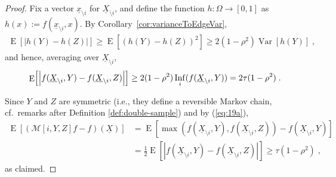 \documentclass{daj}
\newcommand{\1}{\mathbbm{1}}
\theoremstyle{plain}
\theoremstyle{definition}
\DeclareMathOperator*{\EE}{E}
\DeclareMathOperator*{\Var}{Var}
\DeclareMathOperator{\Inf}{Inf}
\newcommand{\cM}{\mathcal{M}}
\begin{document}
\begin{proof}
Fix a vector $\underline{x}_{\setminus i}$ for 
$\underline{X}_{\setminus i}$,
and define the function $h: \Omega \to [0,1]$ as
$h(x) := f(\underline{x}_{\setminus i}, x)$.
By Corollary~\ref{cor:varianceToEdgeVar},
\begin{align*}
\EE[|h(Y) - h(Z)|]
\geq
\EE[(h(Y) - h(Z))^2]
\geq
2(1-\rho^2) \Var[h(Y)] \; ,
\end{align*}
and hence, averaging over $\underline{X}_{\setminus i}$,
\begin{align}\label{eq:19a}
\EE\Bigl[\Bigl|f(\underline{X}_{\setminus i}, Y) - 
f(\underline{X}_{\setminus i}, Z) \Bigr|\Bigr] 
\geq 2(1-\rho^2) \Inf_i(f(\underline{X}_{\setminus i}, Y))
= 2\tau(1-\rho^2) \; .
\end{align}

Since $Y$ and $Z$ are symmetric (i.e., they define a reversible Markov chain,
cf.~remarks after Definition \ref{def:double-sample}) and by (\ref{eq:19a}),
\begin{align*}
\EE \left[ \left(\cM[i, Y, Z]f-f\right)(\underline{X}) \right]
&=
\EE \left[ \max(f(\underline{X}_{\setminus i}, Y), f(\underline{X}_{\setminus i}, Z))
- f(\underline{X}_{\setminus i}, Y) \right]
\\&= 
\frac12 \EE \left[ \left| f(\underline{X}_{\setminus i}, Y) - 
  f(\underline{X}_{\setminus i}, Z) \right| \right]
\ge
\tau(1-\rho^2) \; ,
\end{align*}
as claimed.
\end{proof}
\end{document}
